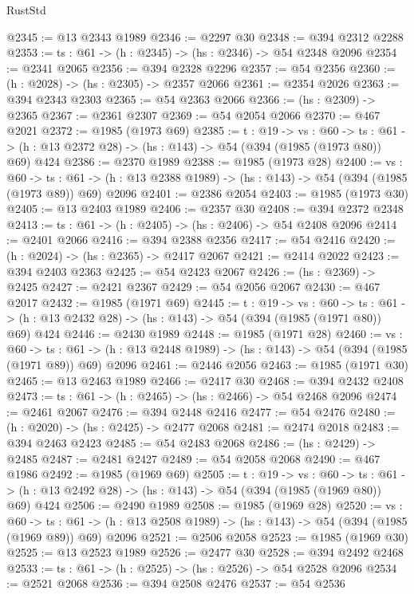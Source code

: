 \begin{lexlean}{RustStd}
\begin{coremodule}
{\begin{coremodule}
{{{{{{{{@2345 := @13 @2343 @1989
@2346 := @2297 @30
@2348 := @394 @2312 @2288
@2353 := {ts : @61} -> (h : @2345) -> (hs : @2346) -> @54 @2348 @2096
@2354 := @2341 @2065
@2356 := @394 @2328 @2296
@2357 := @54 @2356
@2360 := (h : @2028) -> (hs : @2305) -> @2357 @2066
@2361 := @2354 @2026
@2363 := @394 @2343 @2303
@2365 := @54 @2363 @2066
@2366 := (hs : @2309) -> @2365
@2367 := @2361 @2307
@2369 := @54 @2054 @2066
@2370 := @467 @2021
@2372 := @1985 (@1973 @69)
@2385 := {t : @19} ->
  {vs : @60} ->
  {ts : @61} -> (h : @13 @2372 @28) -> (hs : @143) -> @54 (@394 (@1985 (@1973 @80)) @69) @424
@2386 := @2370 @1989
@2388 := @1985 (@1973 @28)
@2400 := {vs : @60} ->
  {ts : @61} -> (h : @13 @2388 @1989) -> (hs : @143) -> @54 (@394 (@1985 (@1973 @89)) @69) @2096
@2401 := @2386 @2054
@2403 := @1985 (@1973 @30)
@2405 := @13 @2403 @1989
@2406 := @2357 @30
@2408 := @394 @2372 @2348
@2413 := {ts : @61} -> (h : @2405) -> (hs : @2406) -> @54 @2408 @2096
@2414 := @2401 @2066
@2416 := @394 @2388 @2356
@2417 := @54 @2416
@2420 := (h : @2024) -> (hs : @2365) -> @2417 @2067
@2421 := @2414 @2022
@2423 := @394 @2403 @2363
@2425 := @54 @2423 @2067
@2426 := (hs : @2369) -> @2425
@2427 := @2421 @2367
@2429 := @54 @2056 @2067
@2430 := @467 @2017
@2432 := @1985 (@1971 @69)
@2445 := {t : @19} ->
  {vs : @60} ->
  {ts : @61} -> (h : @13 @2432 @28) -> (hs : @143) -> @54 (@394 (@1985 (@1971 @80)) @69) @424
@2446 := @2430 @1989
@2448 := @1985 (@1971 @28)
@2460 := {vs : @60} ->
  {ts : @61} -> (h : @13 @2448 @1989) -> (hs : @143) -> @54 (@394 (@1985 (@1971 @89)) @69) @2096
@2461 := @2446 @2056
@2463 := @1985 (@1971 @30)
@2465 := @13 @2463 @1989
@2466 := @2417 @30
@2468 := @394 @2432 @2408
@2473 := {ts : @61} -> (h : @2465) -> (hs : @2466) -> @54 @2468 @2096
@2474 := @2461 @2067
@2476 := @394 @2448 @2416
@2477 := @54 @2476
@2480 := (h : @2020) -> (hs : @2425) -> @2477 @2068
@2481 := @2474 @2018
@2483 := @394 @2463 @2423
@2485 := @54 @2483 @2068
@2486 := (hs : @2429) -> @2485
@2487 := @2481 @2427
@2489 := @54 @2058 @2068
@2490 := @467 @1986
@2492 := @1985 (@1969 @69)
@2505 := {t : @19} ->
  {vs : @60} ->
  {ts : @61} -> (h : @13 @2492 @28) -> (hs : @143) -> @54 (@394 (@1985 (@1969 @80)) @69) @424
@2506 := @2490 @1989
@2508 := @1985 (@1969 @28)
@2520 := {vs : @60} ->
  {ts : @61} -> (h : @13 @2508 @1989) -> (hs : @143) -> @54 (@394 (@1985 (@1969 @89)) @69) @2096
@2521 := @2506 @2058
@2523 := @1985 (@1969 @30)
@2525 := @13 @2523 @1989
@2526 := @2477 @30
@2528 := @394 @2492 @2468
@2533 := {ts : @61} -> (h : @2525) -> (hs : @2526) -> @54 @2528 @2096
@2534 := @2521 @2068
@2536 := @394 @2508 @2476
@2537 := @54 @2536
}}}}}}}}
\end{coremodule}}
\end{coremodule}
\end{lexlean}
